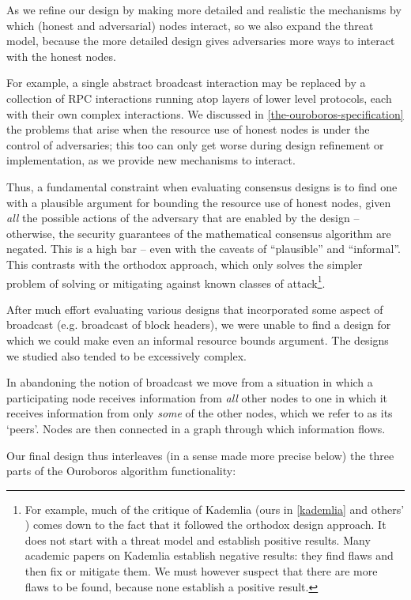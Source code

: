 \documentclass[11pt,a4paper]{article}
\begin{document}
As we refine our design by making more detailed and realistic the
mechanisms by which (honest and adversarial) nodes interact, so we also
expand the threat model, because the more detailed design gives
adversaries more ways to interact with the honest nodes.

For example, a single abstract broadcast interaction may be replaced by
a collection of RPC interactions running atop layers of lower level
protocols, each with their own complex interactions. We discussed in
\cref{the-ouroboros-specification} the
problems that arise when the resource use of honest nodes is under the
control of adversaries; this too can only get worse during design
refinement or implementation, as we provide new mechanisms to interact.

Thus, a fundamental constraint when evaluating consensus designs is to
find one with a plausible argument for bounding the resource use of
honest nodes, given \emph{all} the possible actions of the adversary
that are enabled by the design -- otherwise, the security guarantees of
the mathematical consensus algorithm are negated. This is a high bar --
even with the caveats of ``plausible'' and ``informal''. This contrasts
with the orthodox approach, which only solves the simpler problem of
solving or mitigating against known classes of attack\footnote{For
  example, much of the critique of Kademlia (ours in
  \cref{kademlia} and others' \cite{MHG18})
  comes down to the fact that it followed the orthodox design approach.
  It does not start with a threat model and establish positive results.
  Many academic papers on Kademlia establish negative results: they find
  flaws and then fix or mitigate them. We must however suspect that
  there are more flaws to be found, because none establish a positive
  result.}.

After much effort evaluating various designs that incorporated some
aspect of broadcast (e.g. broadcast of block headers), we were unable to
find a design for which we could make even an informal resource bounds
argument. The designs we studied also tended to be excessively complex.

In abandoning the notion of broadcast we move from a situation in which
a participating node receives information from \emph{all} other nodes to
one in which it receives information from only \emph{some} of the other
nodes, which we refer to as its `peers'. Nodes are then connected in a
graph through which information flows.

Our final design thus interleaves (in a sense made more precise below)
the three parts of the Ouroboros algorithm functionality:
\end{document}
